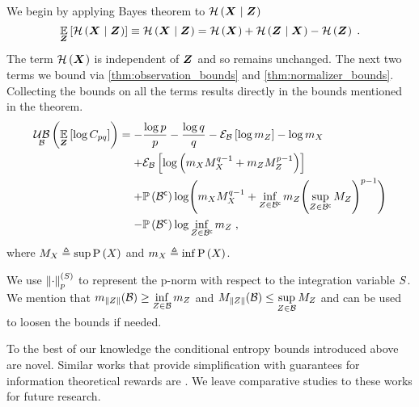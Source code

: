 \begin{proofE}
	We begin by applying Bayes theorem to $\mathcal{H}\left({\boldsymbol X_{}}\mid{\ensuremath{\boldsymbol Z_{}}}\right)$
	\begin{equation}
		\operatorname*{\mathbb{E}}\limits_{\boldsymbol Z_{}}\left[{\mathcal{H}\left({\boldsymbol X_{}}\mid{\ensuremath{\boldsymbol Z_{}}}\right)}\right]\equiv\mathcal{H}\left({\boldsymbol X_{}}\mid{\ensuremath{\boldsymbol Z_{}}}\right)=\mathcal{H}\left({\boldsymbol X_{}}\right)+\mathcal{H}\left({\boldsymbol Z_{}}\mid{\ensuremath{\boldsymbol X_{}}}\right)-\mathcal{H}\left({\boldsymbol Z_{}}\right)\;.
	\end{equation}
	The term $\mathcal{H}\left({\boldsymbol X_{}}\right)$ is independent of $\boldsymbol Z_{}$ and so remains unchanged. The next two terms we bound via \cref{thm:observation_bounds} and \cref{thm:normalizer_bounds}. Collecting the bounds on all the terms results directly in the bounds mentioned in the theorem.
	\begin{equation*}
		\begin{split}
			\upperbound_\subSpace\left(\expectation{\log C_{pq}}{\observationsRV{}}\right)&=-\frac{\log p}{p}-\frac{\log q}{q}-\partialexpectation{\log m_{\observations{}}}{\subSpace}-\log m_{\states{}}\\
			&\phantomeq+ \partialexpectation{\log\left(m_{\states{}}M_{\states{}}^{q-1}+m_{\observations{}}M_{\observations{}}^{p-1}\right)}{\subSpace}\\
			&\phantomeq+\measure{\stcomp{\subSpace}}\log\Biggl( m_{\states{}}M_{\states{}}^{q-1}+\inf_{\observations{}\in\stcomp{\subSpace}}m_{\observations{}}\Biggl(\sup_{\observations{}\in\stcomp{\subSpace}}M_{\observations{}}\Biggr)^{p-1}\Biggr) \\
			&\phantomeq-\measure{\stcomp{\subSpace}}\log\inf_{\observations{}\in\stcomp{\subSpace}}m_{\observations{}}\;,
		\end{split}
	\end{equation*}
	where $M_{X_{}}\triangleq\sup\mathrm{P}\left({X_{}}\right)$ and $m_{X_{}}\triangleq\inf\mathrm{P}\left({X_{}}\right)$.
\end{proofE}
We use $\left\lVert\cdot\right\rVert_{p}^{(S)}$ to represent the p-norm with respect to the integration variable $S$. We mention that $m_{\lVert Z_{}\rVert}(\mathcal B)\geq \inf\limits_{Z_{}\in\mathcal B}m_{Z_{}}$ and $M_{\lVert Z_{}\rVert}(\mathcal B)\leq \sup\limits_{Z_{}\in\mathcal B}M_{Z_{}}$ and can be used to loosen the bounds if needed.

To the best of our knowledge the conditional entropy bounds introduced above are novel. Similar works that provide simplification with guarantees for information theoretical rewards are \cite{Sztyglic22iros,Barenboim22ijcai,Yotam24tro}. We leave comparative studies to these works for future research.

